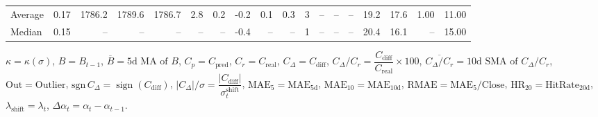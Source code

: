 \begin{threeparttable}
{\begin{tabular}{lrrrrrrrrrrrrrrrrr}
Average &     0.17 & 1786.2 & 1789.6 & 1786.7 &        2.8 &            0.2 &                      -0.2 &                      0.1 &                 0.3 &              3 &         -- &        -- &             -- &             19.2 &                17.6 &            1.00 &                  11.00 \\
 Median &     0.15 &     -- &     -- &     -- &         -- &             -- &                      -0.4 &                       -- &                  -- &              1 &         -- &        -- &             -- &             20.4 &                16.1 &              -- &                  15.00 \\
\bottomrule
\end{tabular}
}
\begin{tablenotes}\footnotesize
\item $\kappa=\kappa(\sigma)$, $B=B_{t-1}$, $\overline{B}=\text{5d MA of }B$, $C_p=C_{\text{pred}}$, $C_r=C_{\text{real}}$, $C_\Delta=C_{\text{diff}}$, $C_\Delta/C_r=\dfrac{C_{\text{diff}}}{C_{\text{real}}}\times100$, $\overline{C_\Delta/C_r}=\text{10d SMA of }C_\Delta/C_r$, $\mathrm{Out}=\text{Outlier}$, $\mathrm{sgn}\,C_\Delta=\operatorname{sign}(C_{\text{diff}})$, $|C_\Delta|/\sigma=\dfrac{|C_{\text{diff}}|}{\sigma_t^{\text{shift}}}$, $\mathrm{MAE}_5=\mathrm{MAE}_{5\text{d}}$, $\mathrm{MAE}_{10}=\mathrm{MAE}_{10\text{d}}$, $\mathrm{RMAE}= \mathrm{MAE}_5 / \text{Close}$, $\mathrm{HR}_{20}=\mathrm{HitRate}_{20\text{d}}$, $\lambda_{\text{shift}}=\lambda_t$, $\Delta\alpha_t=\alpha_t-\alpha_{t-1}$.
\end{tablenotes}
\end{threeparttable}
\endgroup

